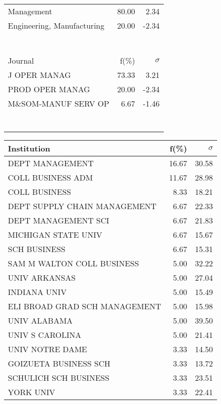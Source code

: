 \documentclass[a4paper,11pt]{report}
\begin{document}
\begin{landscape}
\begin{table}[!ht]
{\begin{tabular}{|l r  r|}
Management & 80.00 & 2.34\\
Engineering, Manufacturing & 20.00 & -2.34\\
 &  & \\
 &  & \\
 &  & \\
 &  & \\
 &  & \\
 &  & \\
 &  & \\
\hline
\hline
Journal & f(\%) & $\sigma$\\
\hline
J OPER MANAG & 73.33 & 3.21\\
PROD OPER MANAG & 20.00 & -2.34\\
M\&SOM-MANUF SERV OP & 6.67 & -1.46\\
 &  & \\
 &  & \\
 &  & \\
 &  & \\
 &  & \\
 &  & \\
 &  & \\
\hline
\end{tabular}
}
{\scriptsize\begin{tabular}{|l r r|}
\hline
Institution & f(\%) & $\sigma$\\
\hline
DEPT MANAGEMENT & 16.67 & 30.58\\
COLL BUSINESS ADM & 11.67 & 28.98\\
COLL BUSINESS & 8.33 & 18.21\\
DEPT SUPPLY CHAIN MANAGEMENT & 6.67 & 22.33\\
DEPT MANAGEMENT SCI & 6.67 & 21.83\\
MICHIGAN STATE UNIV & 6.67 & 15.67\\
SCH BUSINESS & 6.67 & 15.31\\
SAM M WALTON COLL BUSINESS & 5.00 & 32.22\\
UNIV ARKANSAS & 5.00 & 27.04\\
INDIANA UNIV & 5.00 & 15.49\\
ELI BROAD GRAD SCH MANAGEMENT & 5.00 & 15.98\\
UNIV ALABAMA & 5.00 & 39.50\\
UNIV S CAROLINA & 5.00 & 21.41\\
UNIV NOTRE DAME & 3.33 & 14.50\\
GOIZUETA BUSINESS SCH & 3.33 & 13.72\\
SCHULICH SCH BUSINESS & 3.33 & 23.51\\
YORK UNIV & 3.33 & 22.41\\

\end{tabular}}
\end{table}
\end{landscape}
\end{document}
